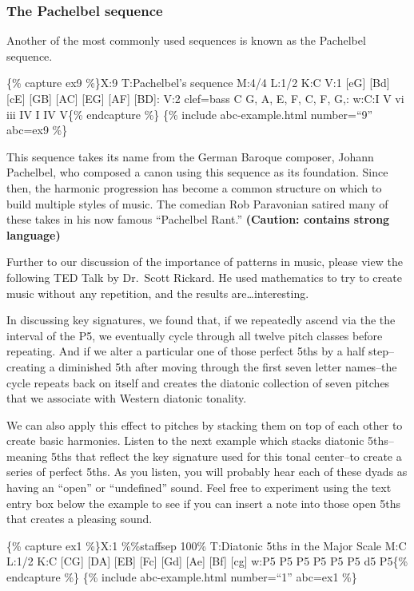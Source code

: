 \documentclass{book}
\begin{document}
\hypertarget{the-pachelbel-sequence}{%
\subsubsection{The Pachelbel sequence}\label{the-pachelbel-sequence}}

Another of the most commonly used sequences is known as the Pachelbel
sequence.

\{\% capture ex9 \%\}X:9 T:Pachelbel's sequence M:4/4 L:1/2 K:C V:1 {[}eG{]}
{[}Bd{]}\textbar{} {[}cE{]} {[}GB{]}\textbar{} {[}AC{]} {[}EG{]}\textbar{}
{[}AF{]} {[}BD{]}:\textbar{} V:2 clef=bass C G,\textbar{} A, E,\textbar{} F,
C,\textbar{} F, G,:\textbar{} w:C:I V vi iii IV I IV V\{\% endcapture \%\}
\{\% include abc-example.html number=``9'' abc=ex9 \%\}

This sequence takes its name from the German Baroque composer, Johann
Pachelbel, who composed a canon using this sequence as its foundation. Since
then, the harmonic progression has become a common structure on which to build
multiple styles of music. The comedian Rob Paravonian satired many of these
takes in his now famous ``Pachelbel Rant.'' \textbf{(Caution: contains strong
language)}

Further to our discussion of the importance of patterns in music, please view
the following TED Talk by Dr.~Scott Rickard. He used mathematics to try to
create music without any repetition, and the results are\ldots interesting.

In discussing key signatures, we found that, if we repeatedly ascend via the
the interval of the P5, we eventually cycle through all twelve pitch classes
before repeating. And if we alter a particular one of those perfect 5ths by a
half step--creating a diminished 5th after moving through the first seven
letter names--the cycle repeats back on itself and creates the diatonic
collection of seven pitches that we associate with Western diatonic tonality.

We can also apply this effect to pitches by stacking them on top of each other
to create basic harmonies. Listen to the next example which stacks diatonic
5ths--meaning 5ths that reflect the key signature used for this tonal
center--to create a series of perfect 5ths. As you listen, you will probably
hear each of these dyads as having an ``open'' or ``undefined'' sound. Feel
free to experiment using the text entry box below the example to see if you
can insert a note into those open 5ths that creates a pleasing sound.

\{\% capture ex1 \%\}X:1 \%\%staffsep 100\% T:Diatonic 5ths in the Major Scale
M:C L:1/2 K:C {[}CG{]} {[}DA{]}\textbar{} {[}EB{]} {[}Fc{]}\textbar{} {[}Gd{]}
{[}Ae{]}\textbar{} {[}Bf{]} {[}cg{]}\textbar\textbar{} w:P5 P5 P5 P5 P5 P5 d5
P5\{\% endcapture \%\} \{\% include abc-example.html number=``1'' abc=ex1 \%\}
\end{document}
